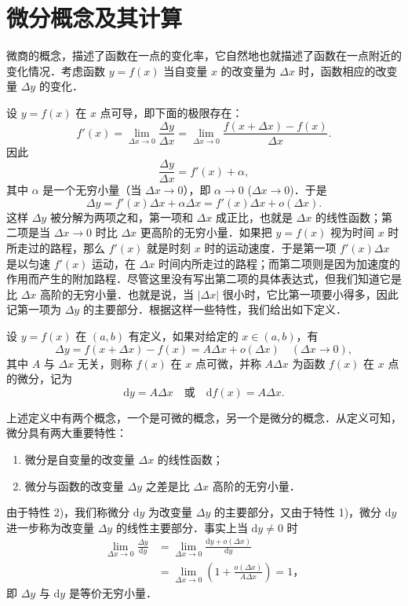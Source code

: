 \section{微分概念及其计算}\label{sec:4.2}

微商的概念，描述了函数在一点的变化率，它自然地也就描述了函数在一点附近的变化情况．考虑函数 $y=f(x)$ 当自变量 $x$ 的改变量为 $\Delta x$ 时，函数相应的改变量 $\Delta y$ 的变化．

设 $y=f(x)$ 在 $x$ 点可导，即下面的极限存在：
\[
f'(x)=\lim_{\Delta x\to 0}\frac{\Delta y}{\Delta x}=\lim_{\Delta x\to 0}\frac{f(x+\Delta x)-f(x)}{\Delta x}.
\]
因此
\[
\frac{\Delta y}{\Delta x}=f'(x)+\alpha,
\]
其中 $\alpha$ 是一个无穷小量（当 $\Delta x\to 0$），即 $\alpha\to0$ ($\Delta x\to0$)．于是
\[
\Delta y=f'(x)\Delta x+\alpha\Delta x=f'(x)\Delta x+o(\Delta x).
\]
这样 $\Delta y$ 被分解为两项之和，第一项和 $\Delta x$ 成正比，也就是 $\Delta x$ 的线性函数；第二项是当 $\Delta x\to0$ 时比 $\Delta x$ 更高阶的无穷小量．如果把 $y=f(x)$ 视为时间 $x$ 时所走过的路程，那么 $f'(x)$ 就是时刻 $x$ 时的运动速度．于是第一项 $f'(x)\Delta x$ 是以匀速 $f'(x)$ 运动，在 $\Delta x$ 时间内所走过的路程；而第二项则是因为加速度的作用而产生的附加路程．尽管这里没有写出第二项的具体表达式，但我们知道它是比 $\Delta x$ 高阶的无穷小量．也就是说，当 $|\Delta x|$ 很小时，它比第一项要小得多，因此记第一项为 $\Delta y$ 的主要部分．根据这样一些特性，我们给出如下定义．

\begin{definition}\label{def:4-2}
设 $y=f(x)$ 在 $(a,b)$ 有定义，如果对给定的 $x\in(a,b)$，有
\[
\Delta y=f(x+\Delta x)-f(x)=A\Delta x+o(\Delta x)\quad(\Delta x\to0),
\]
其中 $A$ 与 $\Delta x$ 无关，则称 $f(x)$ 在 $x$ 点可微，并称 $A\Delta x$ 为函数 $f(x)$ 在 $x$ 点的微分，记为
\[
\mathrm{d}y=A\Delta x \quad\text{或}\quad \mathrm{d}f(x)=A\Delta x.
\]
\end{definition}

上述定义中有两个概念，一个是可微的概念，另一个是微分的概念．从定义可知，微分具有两大重要特性：
\begin{enumerate}[1)]
\item 微分是自变量的改变量 $\Delta x$ 的线性函数；
\item 微分与函数的改变量 $\Delta y$ 之差是比 $\Delta x$ 高阶的无穷小量．
\end{enumerate}

由于特性 2)，我们称微分 $\mathrm{d}y$ 为改变量 $\Delta y$ 的主要部分，又由于特性 1)，微分 $\mathrm{d}y$ 进一步称为改变量 $\Delta y$ 的线性主要部分．事实上当 $\mathrm{d}y\neq0$ 时
\[
\begin{aligned}
\lim_{\Delta x\to0}\frac{\Delta y}{\mathrm{d}y}&=\lim_{\Delta x\to0}\frac{\mathrm{d}y+o(\Delta x)}{\mathrm{d}y}\\
&=\lim_{\Delta x\to0}\left(1+\frac{o(\Delta x)}{A\Delta x}\right)=1\text{，}
\end{aligned}
\]
即 $\Delta y$ 与 $\mathrm{d}y$ 是等价无穷小量．

